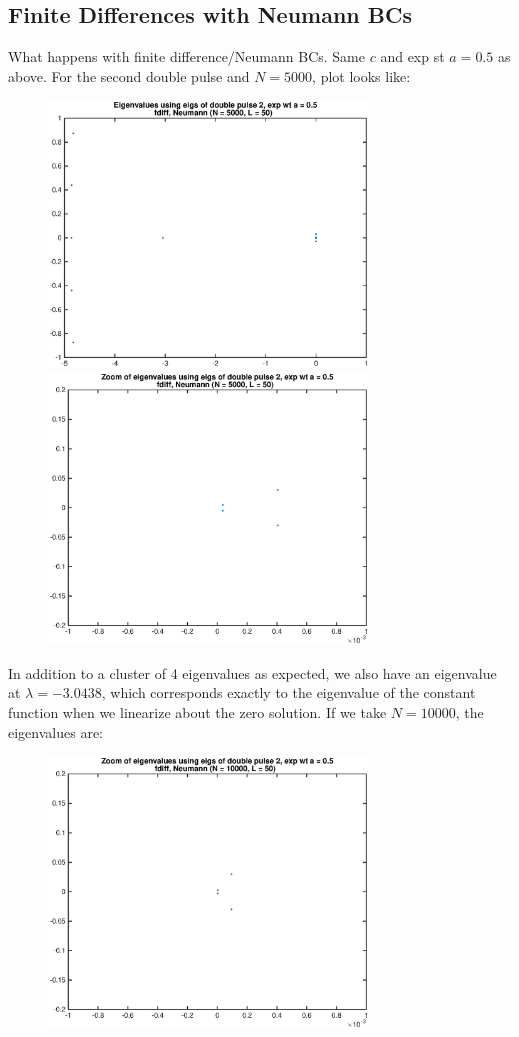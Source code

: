 \documentclass[12pt]{article}
\begin{document}
\subsection*{Finite Differences with Neumann BCs}
What happens with finite difference/Neumann BCs. Same $c$ and exp st $a = 0.5$ as above. For the second double pulse and $N = 5000$, plot looks like:
\begin{figure}[H]
\includegraphics[width=8.5cm]{fd5000eigs.eps}
\includegraphics[width=8.5cm]{fd5000eigszoom.eps}
\end{figure}
In addition to a cluster of 4 eigenvalues as expected, we also have an eigenvalue at $\lambda = -3.0438$, which corresponds exactly to the eigenvalue of the constant function when we linearize about the zero solution. If we take $N = 10000$, the eigenvalues are:
\begin{figure}[H]
\includegraphics[width=8.5cm]{fd10000eigszoom.eps}
\end{figure}
\end{document}
